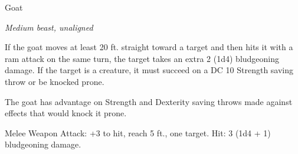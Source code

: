 \begin{monsterbox}{Goat}
\begin{hangingpar}
\textit{Medium beast, unaligned}
\end{hangingpar}
\dndline%
\basics[%
armorclass = 10,
hitpoints = 1d8,
speed = {40 ft.}
]
\dndline%
\stats[%
STR = \stat{12},
DEX = \stat{10},
CON = \stat{11},
INT = \stat{2},
WIS = \stat{10},
CHA = \stat{5}
]
\dndline%
\details[%
skills={},
damageimmunities={},
savingthrows={},
conditionimmunities={},
damageresistances={},
damagevulnerabilities={},
senses={passive Perception 10},
challenge=0
]
\dndline%
\begin{monsteraction}[Charge]
If the goat moves at least 20 ft. straight toward a target and then hits it with a ram attack on the same turn, the target takes an extra 2 (1d4) bludgeoning damage. If the target is a creature, it must succeed on a DC 10 Strength saving throw or be knocked prone.
\end{monsteraction}
\begin{monsteraction}
The goat has advantage on Strength and Dexterity saving throws made against effects that would knock it prone.
\end{monsteraction}
\begin{monsteraction}[Ram]
Melee Weapon Attack: +3 to hit, reach 5 ft., one target. Hit: 3 (1d4 + 1) bludgeoning damage.
\end{monsteraction}
\end{monsterbox}
